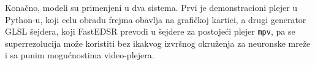 \documentclass[12pt,a4paper]{article}
\begin{document}
Konačno, modeli su primenjeni u dva sistema. Prvi je demonstracioni plejer u Python-u, koji celu obradu frejma obavlja na grafičkoj kartici, a drugi generator GLSL šejdera, koji FastEDSR prevodi u šejdere za postojeći plejer \texttt{mpv}, pa se superrezolucija može koristiti bez ikakvog izvršnog okruženja za neuronske mreže i sa punim mogućnostima video-plejera.

\newpage

{\small
\let\oldthebibliography\thebibliography
\renewcommand{\thebibliography}[1]{\oldthebibliography{#1}\setlength{\itemsep}{0pt}\setlength{\parskip}{0pt}}

}
\end{document}
